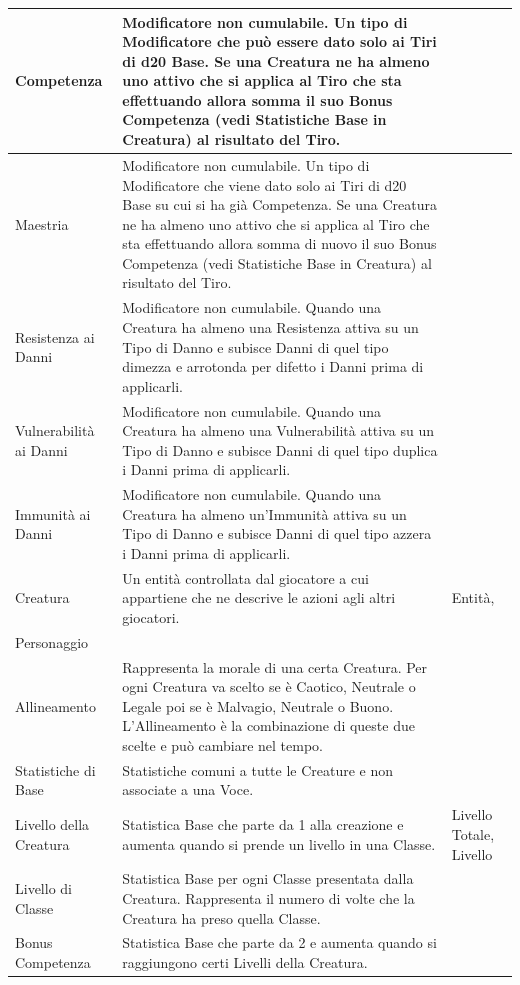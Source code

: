 \documentclass[a4paper, 11pt]{article}
\let\newline\\
\begin{document}
\begin{center}
\begin{longtable}{ |p{3.5cm}|p{9cm}|p{3cm}|  }
    Competenza & Modificatore non cumulabile. Un tipo di Modificatore che può essere dato solo ai Tiri di d20 Base. Se una Creatura ne ha almeno uno attivo che si applica al Tiro che sta effettuando allora somma il suo Bonus Competenza (vedi Statistiche Base in Creatura) al risultato del Tiro. & \\\hline
    Maestria & Modificatore non cumulabile. Un tipo di Modificatore che viene dato solo ai Tiri di d20 Base su cui si ha già Competenza. Se una Creatura ne ha almeno uno attivo che si applica al Tiro che sta effettuando allora somma di nuovo il suo Bonus Competenza (vedi Statistiche Base in Creatura) al risultato del Tiro. & \\\hline
    Resistenza ai Danni & Modificatore non cumulabile. Quando una Creatura ha almeno una Resistenza attiva su un Tipo di Danno e subisce Danni di quel tipo dimezza e arrotonda per difetto i Danni prima di applicarli. & \\\hline
    Vulnerabilità ai Danni & Modificatore non cumulabile. Quando una Creatura ha almeno una Vulnerabilità attiva su un Tipo di Danno e subisce Danni di quel tipo duplica i Danni prima di applicarli. & \\\hline
    Immunità ai Danni & Modificatore non cumulabile. Quando una Creatura ha almeno un’Immunità attiva su un Tipo di Danno e subisce Danni di quel tipo azzera i Danni prima di applicarli. & \\\hline
    Creatura & Un entità controllata dal giocatore a cui appartiene che ne descrive le azioni agli altri giocatori. & Entità, \newline Personaggio \\\hline
    Allineamento & Rappresenta la morale di una certa Creatura. Per ogni Creatura va scelto se è Caotico, Neutrale o Legale poi se è Malvagio, Neutrale o Buono. L’Allineamento è la combinazione di queste due scelte e può cambiare nel tempo. & \\\hline
    Statistiche di Base & Statistiche comuni a tutte le Creature e non associate a una Voce. & \\\hline
    Livello della Creatura & Statistica Base che parte da 1 alla creazione e aumenta quando si prende un livello in una Classe. & Livello Totale, Livello \\\hline
    Livello di Classe & Statistica Base per ogni Classe presentata dalla Creatura. Rappresenta il numero di volte che la Creatura ha preso quella Classe. & \\\hline
    Bonus Competenza & Statistica Base che parte da 2 e aumenta quando si raggiungono certi Livelli della Creatura. & \\\hline

\end{longtable}
\end{center}
\end{document}
